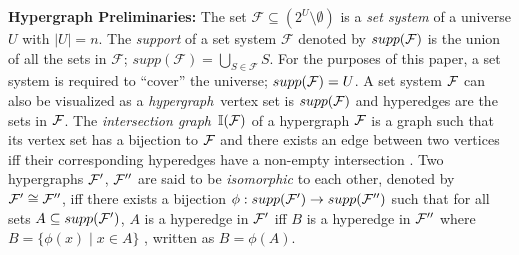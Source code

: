 \documentclass[11pt,
               envcountsect,
               envcountsame]
               {../lib/llncs2e/llncs}
\def\cF{{\cal F}}
\def\F{{\mathcal F}}
\def\bI{\mathbb I}
\begin{document}
{\bf Hypergraph Preliminaries:} The set $\F \subseteq (2^{U} \setminus
\emptyset)$ is a {\em set system} of a universe $U$ with $|U| = n$.
The {\em support} of a set system $\F$ denoted by $supp(\cF)$ is the
union of all the sets in $\F$; $supp(\F) = \bigcup_{S \in \F}S$. For
the purposes of this paper, a set system is required to ``cover'' the
universe; $ supp(\cF) = U$.  A set system $\cF$ can also be visualized
as a {\em hypergraph}\, vertex set is $supp(\cF)$ and hyperedges are
the sets in $\cF$.  The {\em intersection graph}\, $\bI(\cF)$ of a
hypergraph $\cF$ is a graph such that its vertex set has a bijection
to $\cF$ and there exists an edge between two vertices iff their
corresponding hyperedges have a non-empty intersection \cite{mcg04}.
Two hypergraphs $\cF'$, $\cF''$ are said to be {\em isomorphic} to
each other, denoted by $\cF' \cong \cF''$, iff there exists a
bijection $\phi: supp(\cF') \rightarrow supp(\cF'')$ such that for all
sets $A \subseteq supp(\cF')$, $A$ is a hyperedge in $\cF'$ iff $B$ is
a hyperedge in $\cF''$ where $B = \{\phi(x) \mid x \in A\}$
\cite{kklv10}, written as $B=\phi(A)$.
\end{document}
